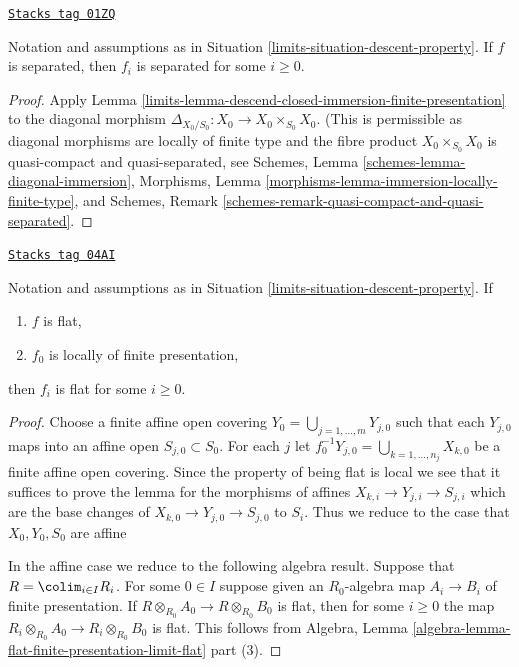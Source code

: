 \begin{lemma}
\label{limits-lemma-descend-separated-finite-presentation}
\href{https://stacks.math.columbia.edu/tag/01ZQ}{\texttt{Stacks tag 01ZQ}}

Notation and assumptions as in Situation \ref{limits-situation-descent-property}.
If $f$ is separated, then $f_i$ is separated for some $i \geq 0$.
\end{lemma}

\begin{proof}

Apply Lemma \ref{limits-lemma-descend-closed-immersion-finite-presentation}
to the diagonal morphism $\Delta_{X_0/S_0} : X_0 \to X_0 \times_{S_0} X_0$.
(This is permissible as diagonal morphisms are locally of finite type
and the fibre product $X_0 \times_{S_0} X_0$ is quasi-compact and
quasi-separated, see
Schemes, Lemma \ref{schemes-lemma-diagonal-immersion},
Morphisms, Lemma \ref{morphisms-lemma-immersion-locally-finite-type}, and
Schemes, Remark \ref{schemes-remark-quasi-compact-and-quasi-separated}.
\end{proof}

\begin{lemma}
\label{limits-lemma-descend-flat-finite-presentation}
\href{https://stacks.math.columbia.edu/tag/04AI}{\texttt{Stacks tag 04AI}}

Notation and assumptions as in Situation \ref{limits-situation-descent-property}.
If
\begin{enumerate}
\item $f$ is flat,
\item $f_0$ is locally of finite presentation,
\end{enumerate}
then $f_i$ is flat for some $i \geq 0$.
\end{lemma}

\begin{proof}
Choose a finite affine open covering
$Y_0 = \bigcup_{j = 1, \ldots, m} Y_{j, 0}$
such that each $Y_{j, 0}$ maps into an affine open
$S_{j, 0} \subset S_0$. For each $j$ let
$f_0^{-1}Y_{j, 0} = \bigcup_{k = 1, \ldots, n_j} X_{k, 0}$ be a
finite affine open covering. Since the property of being flat is
local we see that it suffices to prove the lemma for the morphisms
of affines $X_{k, i} \to Y_{j, i} \to S_{j, i}$ which are the base
changes of $X_{k, 0} \to Y_{j, 0} \to S_{j, 0}$ to $S_i$.
Thus we reduce to the case that $X_0, Y_0, S_0$ are affine

\medskip\noindent
In the affine case we reduce to the following algebra result.
Suppose that $R = \colim_{i \in I} R_i$. For some $0 \in I$
suppose given an $R_0$-algebra map $A_i \to B_i$ of finite presentation.
If $R \otimes_{R_0} A_0 \to R \otimes_{R_0} B_0$ is flat, then
for some $i \geq 0$ the map
$R_i \otimes_{R_0} A_0 \to R_i \otimes_{R_0} B_0$ is flat.
This follows from Algebra,
Lemma \ref{algebra-lemma-flat-finite-presentation-limit-flat} part (3).
\end{proof}

